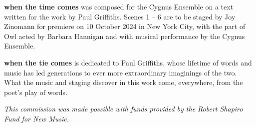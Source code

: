 \textbf{when the time comes} was composed for the Cygnus Ensemble on a text
written for the work by Paul Griffiths. Scenes 1 -- 6 are to be staged by Joy
Zinomann for premiere on 10 October 2024 in New York City, with the part of Owl
acted by Barbara Hannigan and with musical performance by the Cygnus Ensemble.

\textbf{when the tie comes} is dedicated to Paul Griffiths, whose lifetime of
words and music has led generations to ever more extraordinary imaginings of
the two. What the music and staging discover in this work come, everywhere,
from the poet's play of words.

\textit{This commission was made possible with funds provided by the Robert
Shapiro Fund for New Music.}
